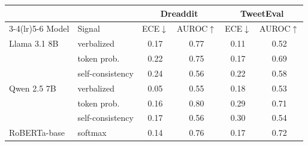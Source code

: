 \begin{tabular}{llcccc}
\toprule
 & & \multicolumn{2}{c}{Dreaddit} & \multicolumn{2}{c}{TweetEval} \\
\cmidrule(lr){3-4}\cmidrule(lr){5-6}
Model & Signal & ECE$\downarrow$ & AUROC$\uparrow$ & ECE$\downarrow$ & AUROC$\uparrow$ \\
\midrule
Llama 3.1 8B & verbalized & 0.17 & 0.77 & 0.11 & 0.52 \\
 & token prob. & 0.22 & 0.75 & 0.17 & 0.69 \\
 & self-consistency & 0.24 & 0.56 & 0.22 & 0.58 \\
Qwen 2.5 7B & verbalized & 0.05 & 0.55 & 0.18 & 0.53 \\
 & token prob. & 0.16 & 0.80 & 0.29 & 0.71 \\
 & self-consistency & 0.17 & 0.56 & 0.30 & 0.54 \\
RoBERTa-base & softmax & 0.14 & 0.76 & 0.17 & 0.72 \\
\bottomrule
\end{tabular}
